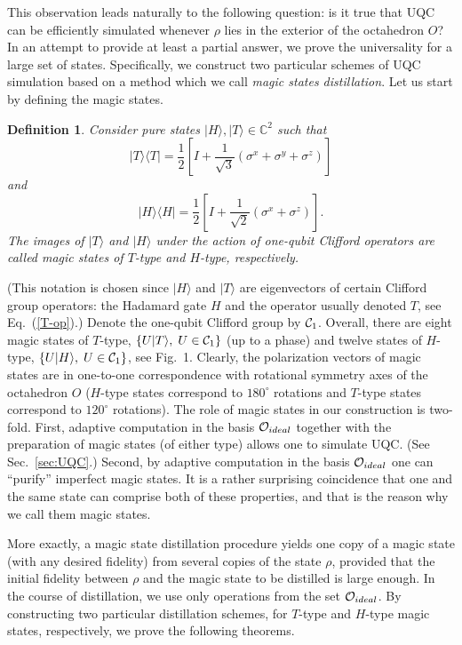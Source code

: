 \documentclass[pra,twocolumn,showpacs]{revtex4}
\newtheorem{dfn}{Definition}
\newcommand{\CC}{\mathbb{C}}
\newcommand{\calO}{{\cal O }}
\newcommand{\la}{\langle}
\newcommand{\ra}{\rangle}
\newcommand*{\Cl}[1]{{\cal C}_{#1}}
\newcommand{\sx}{\sigma^x}
\newcommand{\sy}{\sigma^y}
\newcommand{\sz}{\sigma^z}
\newcommand{\Tt}{$T$}
\newcommand{\Hh}{$H$}
\begin{document}
This observation leads naturally to the following question: is it true that
UQC can be efficiently simulated whenever $\rho$ lies in the exterior of the
octahedron $O$? In an attempt to provide at least a partial answer, we prove
the universality for a large set of states.  Specifically, we
construct two particular schemes of UQC simulation based on a method which we
call {\it magic states distillation}. Let us start by defining the magic
states.  
\begin{dfn}
Consider  pure states $|H\ra, |T\ra \in \CC^2$ such that
\[
|T\ra\la T| = \frac12\left[ I + 
\frac1{\sqrt{3}} \left( \sx + \sy + \sz \right)\right]
\]
and
\[
|H\ra\la H| = \frac12 \left[ I + 
\frac1{\sqrt{2}} \left( \sx + \sz \right)\right].
\]
The images of $|T\ra$ and $|H\ra$ under the action of one-qubit Clifford
operators are called magic states of \Tt-type and \Hh-type, respectively.
\end{dfn}

\noindent
(This notation is chosen since $|H\ra$ and $|T\ra$ are eigenvectors of certain
Clifford group operators: the Hadamard gate $H$ and the operator usually
denoted $T$, see Eq.~(\ref{T-op}).) 
Denote the one-qubit Clifford group by $\Cl{1}$.
Overall, there are eight magic states of
\Tt-type, $\{ U|T\ra, \; U\in \Cl{1}\}$ (up to a phase) and twelve states of
\Hh-type, $\{ U|H\ra,\; U\in \Cl{1}\}$, see Fig.~1.
Clearly, the polarization
vectors of magic states are in one-to-one correspondence with rotational
symmetry axes of the octahedron $O$ (\Hh-type states correspond to $180^\circ$
rotations and \Tt-type states correspond to $120^\circ$ rotations). The role of
magic states in our construction is two-fold.  First, adaptive computation in
the basis $\calO_{ideal}$ together with the preparation of magic states (of
either type) allows one to simulate UQC. (See Sec.~\ref{sec:UQC}.) Second, by
adaptive computation in the basis $\calO_{ideal}$ one can ``purify'' imperfect
magic states. It is a rather surprising coincidence that one and the same
state can comprise both of these properties, and that is the reason why we call  
them magic states.




More exactly, a magic state distillation procedure yields one copy of a magic
state (with any desired fidelity) from several copies of the state $\rho$,
provided that the initial fidelity between $\rho$ and the magic state to be
distilled is large enough. In the course of distillation, we use only
operations from the set $\calO_{ideal}$.  By constructing two particular
distillation schemes, for \Tt-type and \Hh-type magic states, respectively, we
prove the following theorems.
\end{document}
